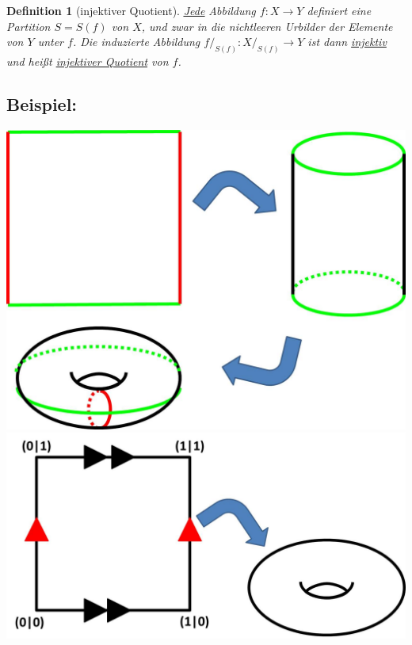 \documentclass[a4paper,11pt,notitlepage]{report}
\newtheorem{definition}{Definition}[chapter]
\newenvironment{bsp}[1]
{
\setlength{\fboxsep}{10pt}
\subsection*{Beispiel: #1}
\begin{upshape}
}
{
\end{upshape}
}
\begin{document}
\begin{definition}[injektiver Quotient]
\underline{\underline{Jede}} Abbildung $f \colon X \rightarrow Y$ definiert eine Partition $S = S(f)$ von $X$, und zwar in die nichtleeren Urbilder der Elemente von $Y$ unter $f$.
\newline
Die induzierte Abbildung $f/_{S(f)} \colon X/_{S(f)} \rightarrow Y$ ist dann \underline{injektiv} und heißt \underline{injektiver Quotient} von $f$.
\end{definition}

\begin{bsp}{}
	\includegraphics[scale=0.6]{images/Quadrat_nach_Torus.jpg}
	\newline
	\includegraphics[scale=0.6]{images/Quotient_Torus.jpg}\newline

\end{bsp}
\end{document}
